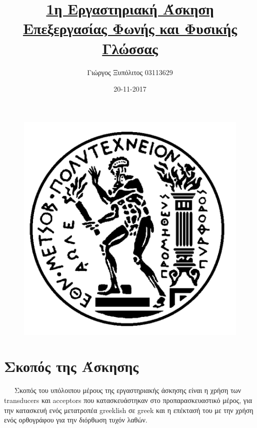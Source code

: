 \documentclass{article}
\title{\underline{1η Εργαστηριακή Άσκηση}\\
	   \underline{Επεξεργασίας Φωνής και Φυσικής Γλώσσας}}
\date{20-11-2017}
\author{Γιώργος Ξυπόλιτος 03113629}
\begin{document}
\begin{figure}[h]
	\centering
	\includegraphics[keepaspectratio]{pictures/promitheas.png}
	\maketitle
\end{figure}

\newpage
{}

\section*{Σκοπός της Άσκησης}
\ \ \ Σκοπός του υπόλοιπου μέρους της εργαστηριακής άσκησης είναι η χρήση των \textlatin{transducers} και \textlatin{acceptors} που κατασκευάστηκαν στο προπαρασκευαστικό μέρος, για την κατασκευή ενός μετατροπέα \textlatin{greeklish} σε \textlatin{greek} και η επέκτασή του με την χρήση ενός ορθογράφου για την διόρθωση τυχόν λαθών.
\end{document}
